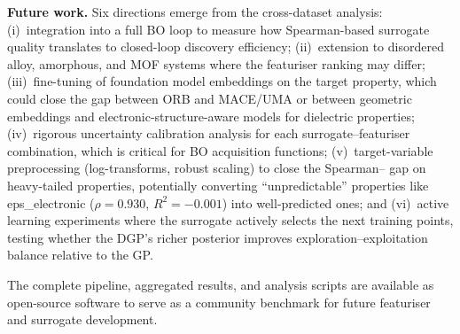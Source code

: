\textbf{Future work.}
Six directions emerge from the cross-dataset analysis:
(i)~integration into a full BO loop to measure how Spearman-based surrogate quality translates to closed-loop discovery efficiency;
(ii)~extension to disordered alloy, amorphous, and MOF systems where the featuriser ranking may differ;
(iii)~fine-tuning of foundation model embeddings on the target property, which could close the gap between ORB and MACE/UMA or between geometric embeddings and electronic-structure-aware models for dielectric properties;
(iv)~rigorous uncertainty calibration analysis for each surrogate--featuriser combination, which is critical for BO acquisition functions;
(v)~target-variable preprocessing (log-transforms, robust scaling) to close the Spearman--\Rtwo{} gap on heavy-tailed properties, potentially converting ``unpredictable'' properties like eps\_electronic ($\rho = 0.930$, $R^2 = -0.001$) into well-predicted ones;
and (vi)~active learning experiments where the surrogate actively selects the next training points, testing whether the DGP's richer posterior improves exploration--exploitation balance relative to the GP.

The complete pipeline, aggregated results, and analysis scripts are available as open-source software to serve as a community benchmark for future featuriser and surrogate development.
